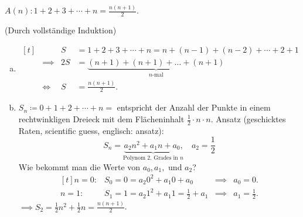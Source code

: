 \documentclass[../ana1.tex]{subfiles}
\begin{document}
\begin{bsp}
	\(A(n): 1+2+3+\cdots+n = \frac{n(n+1)}{2}\).
	\begin{bew}(Durch vollständige Induktion)
	\end{bew}
\end{bsp}
\begin{bem}\leavevmode
	\begin{enumerate}[(a)]
		\item \(\begin{aligned}[t]
				&	         		 & S &= 1 + 2 + 3 + \cdots + n = n + (n-1)+ (n-2) + \cdots + 2 + 1\\
				&\implies 		     &2S &= \underbrace{(n+1)+(n+1)+\dots+(n+1)}_{n\text{-mal}}\\
				&\Longleftrightarrow & S &= \frac{n(n+1)}{2}.
			  \end{aligned}\)
		\item \( S_{n} \coloneqq 0 + 1 + 2 + \cdots + n = \) entspricht der Anzahl der Punkte in einem 
			  rechtwinkligen Dreieck mit dem Flächeninhalt \(\frac{1}{2}\cdot n \cdot n\).\newline
			  Ansatz (\glqq geschicktes Raten\grqq , \glqq scientific guess\grqq , englisch: ansatz):
			  \[S_{n} = \underbrace{a_{2}n^{2} + a_{1}n + a_{0}\text{,}}_{\text{Polynom }2\text{. Grades in }n}\quad a_{2} = \frac{1}{2}\]
			  Wie bekommt man die Werte von \(a_0, a_1,\) und \(a_2\)?
			  \[\begin{aligned}[t]
				n=0\colon& S_{0} = 0 = a_{2}0^{2} + a_{1}0 + a_{0}               &\implies& a_{0} = 0.\\ 
				n=1\colon& S_{1} = 1 = a_{2}1^{2} + a_{1}1 = \frac{1}{2} + a_{1} &\implies& a_{1} = \frac{1}{2}.
			  \end{aligned}\]
			  \(\implies S_{2} = \frac{1}{2}n^{2} + \frac{1}{2}n = \frac{n(n+1)}{2}\).
	\end{enumerate}
\end{bem}
\end{document}
